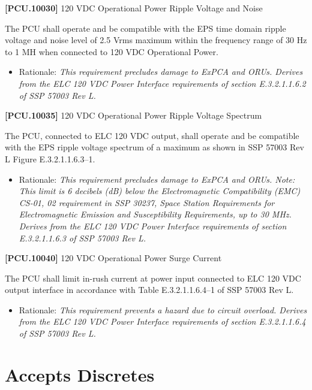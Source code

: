 \documentclass[12pt,oneside,oldfontcommands]{memoir}
\begin{document}
\textbf{[PCU.10030]} 120 \gls{VDC} Operational Power Ripple Voltage and Noise

The \gls{PCU} shall operate and be compatible with the EPS time domain ripple voltage and noise level of 2.5 Vrms maximum within the frequency range of 30 Hz to 1 MH when connected to 120 \gls{VDC} Operational Power.

\begin{itemize}
\item{} Rationale: \emph{This requirement precludes damage to ExPCA and ORUs. Derives from the ELC 120 VDC Power Interface requirements of section E.3.2.1.1.6.2 of SSP 57003 Rev L.}

\end{itemize}

\textbf{[PCU.10035]} 120 \gls{VDC} Operational Power Ripple Voltage Spectrum

The \gls{PCU}, connected to \gls{ELC} 120 \gls{VDC} output, shall operate and be compatible with the EPS ripple voltage spectrum of a maximum as shown in SSP 57003 Rev L Figure E.3.2.1.1.6.3--1.

\begin{itemize}
\item{} Rationale: \emph{This requirement precludes damage to ExPCA and ORUs. Note: This limit is 6 decibels (dB) below the Electromagnetic Compatibility (EMC) CS-01, 02 requirement in SSP 30237, Space Station Requirements for Electromagnetic Emission and Susceptibility Requirements, up to 30 MHz. Derives from the ELC 120 VDC Power Interface requirements of section E.3.2.1.1.6.3 of SSP 57003 Rev L.}

\end{itemize}

\textbf{[PCU.10040]} 120 \gls{VDC} Operational Power Surge Current

The \gls{PCU} shall limit in-rush current at power input connected to \gls{ELC} 120 \gls{VDC} output interface in accordance with Table E.3.2.1.1.6.4--1 of SSP 57003 Rev L.

\begin{itemize}
\item{} Rationale: \emph{This requirement prevents a hazard due to circuit overload. Derives from the ELC 120 VDC Power Interface requirements of section E.3.2.1.1.6.4 of SSP 57003 Rev L.}

\end{itemize}

\section{Accepts Discretes}
\label{acceptsdiscretes}
\end{document}
